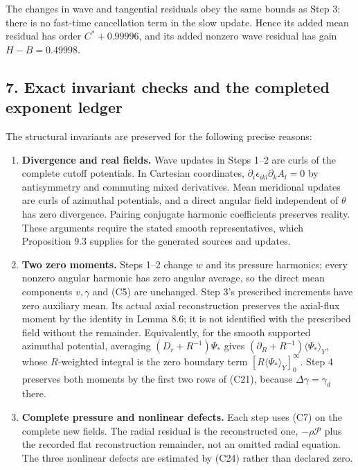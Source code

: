 \documentclass[10pt,a4paper]{article}
\begin{document}
The changes in wave and tangential residuals obey the same bounds as Step 3; there is no fast-time cancellation term in the slow update. Hence its added mean residual has order \(C^*+0.99996\), and its added nonzero wave residual has gain \(H-B=0.49998\).

\subsection{7. Exact invariant checks and the completed exponent ledger}\label{nsupstream:stage_cycle_gain_audit:exact-invariant-checks-and-the-completed-exponent-ledger}

The structural invariants are preserved for the following precise reasons:

\begin{enumerate}
\def\labelenumi{\arabic{enumi}.}
\item
  \textbf{Divergence and real fields.} Wave updates in Steps 1--2 are curls of the complete cutoff potentials. In Cartesian coordinates, \(\partial_i\epsilon_{ikl}\partial_kA_l=0\) by antisymmetry and commuting mixed derivatives. Mean meridional updates are curls of azimuthal potentials, and a direct angular field independent of \(\theta\) has zero divergence. Pairing conjugate harmonic coefficients preserves reality. These arguments require the stated smooth representatives, which Proposition 9.3 supplies for the generated sources and updates.
\item
  \textbf{Two zero moments.} Steps 1--2 change \(w\) and its pressure harmonics; every nonzero angular harmonic has zero angular average, so the direct mean components \(v,\gamma\) and (C5) are unchanged. Step 3's prescribed increments have zero auxiliary mean. Its actual axial reconstruction preserves the axial-flux moment by the identity in Lemma 8.6; it is not identified with the prescribed field without the remainder. Equivalently, for the smooth supported azimuthal potential, averaging \((D_r+R^{-1})\Psi_*\) gives \((\partial_R+R^{-1})\langle\Psi_*\rangle_Y\), whose \(R\)-weighted integral is the zero boundary term \([R\langle\Psi_*\rangle_Y]_0^\infty\). Step 4 preserves both moments by the first two rows of (C21), because \(\Delta\gamma=\gamma_d\) there.
\item
  \textbf{Complete pressure and nonlinear defects.} Each step uses (C7) on the complete new fields. The radial residual is the reconstructed one, \(-\rho\mathcal P\) plus the recorded flat reconstruction remainder, not an omitted radial equation. The three nonlinear defects are estimated by (C24) rather than declared zero.

\end{enumerate}
\end{document}

